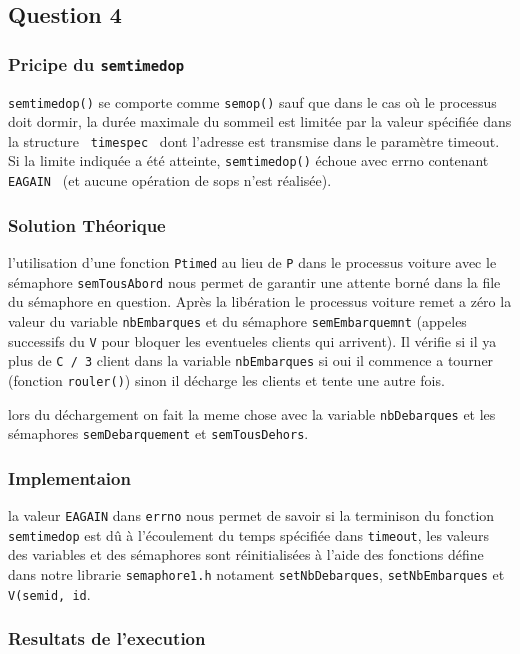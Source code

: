 \subsection{Question 4}
\subsubsection{Pricipe du \texttt{semtimedop}}
\texttt{semtimedop()} se comporte comme \texttt{semop()} sauf que dans le cas
où le processus doit dormir, la durée maximale du sommeil est limitée par la
valeur spécifiée dans la structure \texttt{ timespec } dont l'adresse est
transmise dans le paramètre timeout. Si la limite indiquée a été atteinte,
\texttt{semtimedop()} échoue avec errno contenant \texttt{ EAGAIN } (et aucune
opération de sops n'est réalisée).

\subsubsection{Solution Théorique}
l'utilisation d'une fonction \texttt{Ptimed} au lieu de \texttt{P} dans le processus
voiture avec le sémaphore \texttt{semTousAbord} nous
permet de garantir une attente borné dans la file du sémaphore en question.
Après la libération le processus voiture remet a zéro la valeur du variable
\texttt{nbEmbarques} et du sémaphore \texttt{semEmbarquemnt} (appeles successifs du
\texttt{V} pour bloquer les eventueles clients qui arrivent). Il vérifie si il
ya plus de \texttt{C / 3} client dans la variable \texttt{nbEmbarques} si oui il
commence a tourner (fonction \texttt{rouler()}) sinon il décharge les clients et
tente une autre fois.

lors du déchargement on fait la meme chose avec la variable
\texttt{nbDebarques} et les sémaphores \texttt{semDebarquement} et \texttt{semTousDehors}.

\subsubsection{Implementaion}
la valeur \texttt{EAGAIN} dans \texttt{errno} nous permet de savoir si la
terminison du fonction \texttt{semtimedop} est dû à l'écoulement du temps
spécifiée dans \texttt{timeout}, les valeurs des variables et des sémaphores
sont réinitialisées à l'aide des fonctions défine dans notre librarie
\texttt{semaphore1.h} notament \texttt{setNbDebarques}, \texttt{setNbEmbarques} et
\texttt{V(semid, id}.

\subsubsection{Resultats de l'execution}



